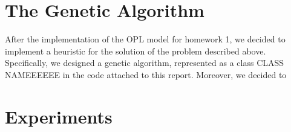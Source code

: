 \documentclass{article}
\begin{document}
\section{The Genetic Algorithm}\label{sec:algorithm}
After the implementation of the OPL model for homework 1, we decided to implement a heuristic for the solution of the problem described above. Specifically, we designed a genetic algorithm, represented as a class CLASS NAMEEEEEE in the code attached to this report. Moreover, we decided to  


\section{Experiments}\label{sec:experiments}
\end{document}
